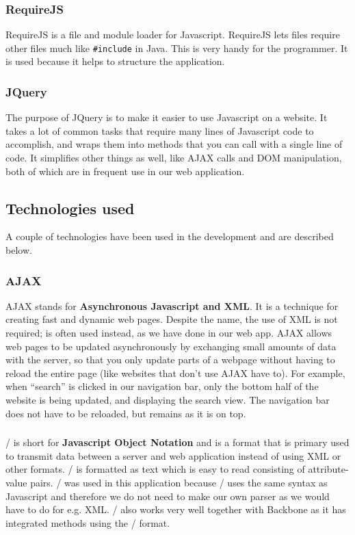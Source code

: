 \subsubsection{RequireJS}
RequireJS\cite{web_5} is a file and module loader for Javascript. RequireJS lets files require other files much like \texttt{\#include} in Java. This is very handy for the programmer. It is used because it helps to structure the application.
\subsubsection{JQuery}
The purpose of JQuery\cite{web_6} is to make it easier to use Javascript on a website. It takes a lot of common tasks that require many lines of Javascript code to accomplish, and wraps them into methods that you can call with a single line of code. It simplifies other things as well, like AJAX calls and DOM manipulation, both of which are in frequent use in our web application.


\subsection{Technologies used}
A couple of technologies have been used in the development and are described below.

\subsubsection{AJAX}
AJAX\cite{web_3} stands for \textbf{Asynchronous Javascript and XML}. It is a technique for creating fast and dynamic web pages. Despite the name, the use of XML is not required; \json is often used instead, as we have done in our web app. AJAX allows web pages to be updated asynchronously by exchanging small amounts of data with the server, so that you only update parts of a webpage without having to reload the entire page (like websites that don’t use AJAX have to). For example, when “search” is clicked in our navigation bar, only the bottom half of the website is being updated, and displaying the search view. The navigation bar does not have to be reloaded, but remains as it is on top.

\subsubsection{\json}
\json/\cite{web_4} is short for \textbf{Javascript Object Notation} and is a format that is primary used to transmit data between a server and web application instead of using XML or other formats.
\json/ is formatted as text which is easy to read consisting of attribute-value pairs.
\json/ was used in this application because \json/ uses the same syntax as Javascript and therefore we do not need to make our own parser as we would have to do for e.g. XML. \json/ also works very well together with Backbone as it has integrated methods using the \json/ format.

